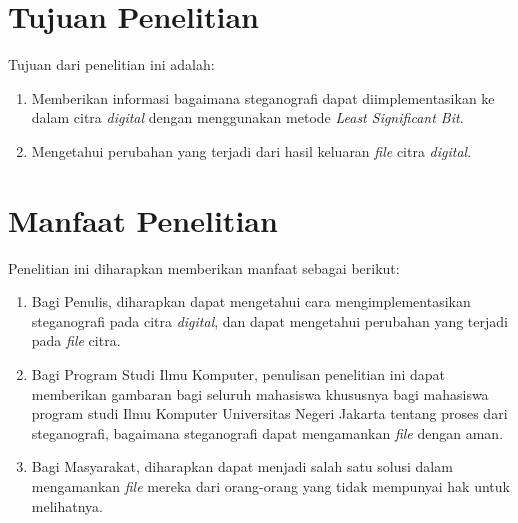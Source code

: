 \section{Tujuan Penelitian}
Tujuan dari penelitian ini adalah: 
\begin{enumerate}
	\item Memberikan informasi bagaimana steganografi dapat diimplementasikan ke dalam citra \emph{digital} dengan menggunakan metode \emph{Least Significant Bit}. 
	\item Mengetahui perubahan yang terjadi dari hasil keluaran \emph{file} citra \emph{digital}.
\end{enumerate}

\section{Manfaat Penelitian}
Penelitian ini diharapkan memberikan manfaat sebagai berikut:
	\begin{enumerate}
		\item Bagi Penulis, diharapkan dapat mengetahui cara mengimplementasikan steganografi pada citra \emph{digital}, dan dapat mengetahui perubahan yang terjadi pada \emph{file} citra.
		\item Bagi Program Studi Ilmu Komputer, penulisan penelitian ini dapat memberikan gambaran bagi seluruh mahasiswa khususnya bagi mahasiswa program studi Ilmu Komputer Universitas Negeri Jakarta tentang proses dari steganografi, bagaimana steganografi dapat mengamankan \emph{file} dengan aman.
		\item Bagi Masyarakat, diharapkan dapat menjadi salah satu solusi dalam mengamankan \emph{file} mereka dari orang-orang yang tidak mempunyai hak untuk melihatnya.   	
	\end{enumerate}
		
\begin{comment}

\end{comment}

